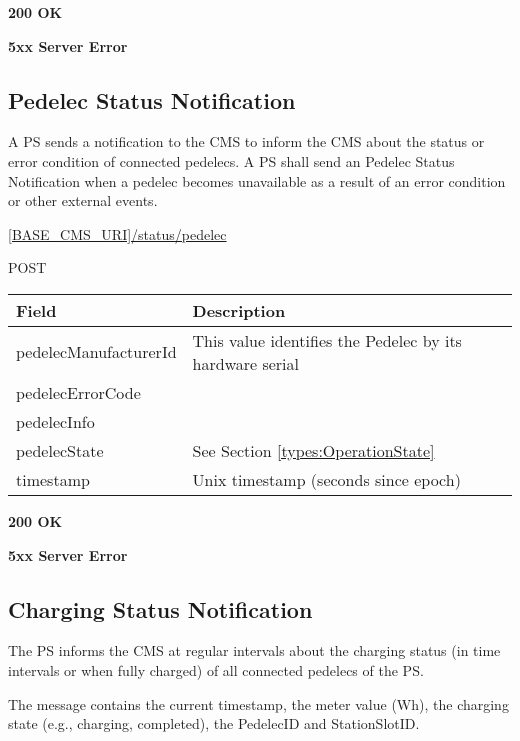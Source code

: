  \textbf{200 OK}

 \textbf{5xx Server Error}

\subsection{Pedelec Status Notification}

A \acs{PS} sends a notification to the \acs{CMS} to inform the \acs{CMS} about the status or error condition of connected pedelecs. A \acs{PS} shall send an Pedelec Status Notification when a pedelec becomes unavailable as a result of an error condition or other external events.

 \url{[BASE_CMS_URI]/status/pedelec}

 POST

\begin{table}[!h]
\vspace{-7mm}
\begin{tabularx}{\linewidth}{ | l | X | }
  \hline
  \rowcolor{table-head}
  Field & Description \\
  \hline
  pedelecManufacturerId 		& This value identifies the Pedelec by its hardware serial\\
  pedelecErrorCode & \\
  pedelecInfo & \\
  pedelecState & See Section \ref{types:OperationState} \\
  timestamp & Unix timestamp (seconds since epoch) \\
  \hline
\end{tabularx}
\end{table}

 \textbf{200 OK}

 \textbf{5xx Server Error}


\subsection{Charging Status Notification}
\label{ps:charging-status}

The \acs{PS} informs the \acs{CMS} at regular intervals about the charging status (in time intervals or when fully charged) of all connected pedelecs of the \acs{PS}.

The message contains the current timestamp, the meter value (Wh), the charging state (e.g., charging, completed), the PedelecID and StationSlotID.

